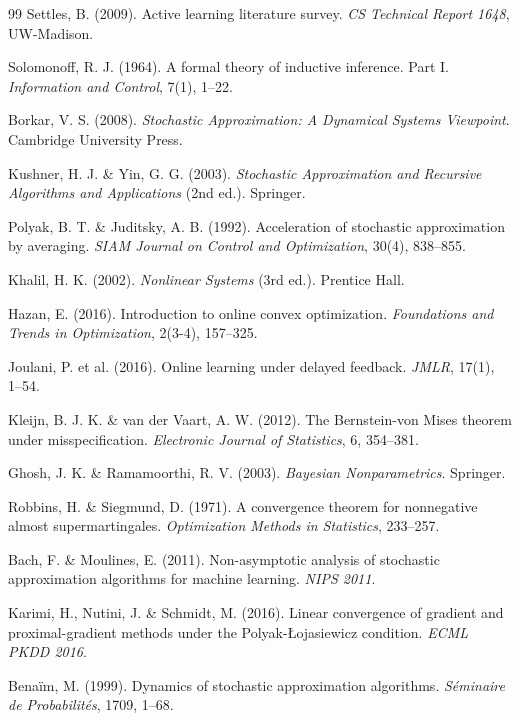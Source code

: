 \documentclass[11pt,a4paper]{article}
\theoremstyle{plain}
\theoremstyle{definition}
\theoremstyle{remark}
\begin{document}
\begin{thebibliography}{99}
Settles, B. (2009).
Active learning literature survey.
\emph{CS Technical Report 1648}, UW-Madison.

Solomonoff, R. J. (1964).
A formal theory of inductive inference. Part I.
\emph{Information and Control}, 7(1), 1--22.

Borkar, V. S. (2008).
\emph{Stochastic Approximation: A Dynamical Systems Viewpoint}. Cambridge University Press.

Kushner, H. J. \& Yin, G. G. (2003).
\emph{Stochastic Approximation and Recursive Algorithms and Applications} (2nd ed.). Springer.

Polyak, B. T. \& Juditsky, A. B. (1992).
Acceleration of stochastic approximation by averaging.
\emph{SIAM Journal on Control and Optimization}, 30(4), 838--855.

Khalil, H. K. (2002).
\emph{Nonlinear Systems} (3rd ed.). Prentice Hall.

Hazan, E. (2016).
Introduction to online convex optimization.
\emph{Foundations and Trends in Optimization}, 2(3-4), 157--325.

Joulani, P. et al. (2016).
Online learning under delayed feedback.
\emph{JMLR}, 17(1), 1--54.

Kleijn, B. J. K. \& van der Vaart, A. W. (2012).
The Bernstein-von Mises theorem under misspecification.
\emph{Electronic Journal of Statistics}, 6, 354--381.

Ghosh, J. K. \& Ramamoorthi, R. V. (2003).
\emph{Bayesian Nonparametrics}. Springer.

Robbins, H. \& Siegmund, D. (1971).
A convergence theorem for nonnegative almost supermartingales.
\emph{Optimization Methods in Statistics}, 233--257.

Bach, F. \& Moulines, E. (2011).
Non-asymptotic analysis of stochastic approximation algorithms for machine learning.
\emph{NIPS 2011}.

Karimi, H., Nutini, J. \& Schmidt, M. (2016).
Linear convergence of gradient and proximal-gradient methods under the Polyak-{\L}ojasiewicz condition.
\emph{ECML PKDD 2016}.

Bena\"im, M. (1999).
Dynamics of stochastic approximation algorithms.
\emph{S\'eminaire de Probabilit\'es}, 1709, 1--68.


\end{thebibliography}
\end{document}
